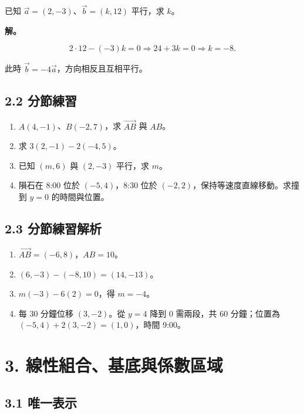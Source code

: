 \documentclass[11pt,a4paper]{article}
\providecommand{\tightlist}{%
  \setlength{\itemsep}{0pt}\setlength{\parskip}{0pt}}
\begin{document}
已知 \(\vec a=(2,-3)\)、\(\vec b=(k,12)\) 平行，求 \(k\)。

\textbf{解。}

\[
2\cdot12-(-3)k=0\Rightarrow24+3k=0\Rightarrow k=-8.
\]

此時 \(\vec b=-4\vec a\)，方向相反且互相平行。

\subsection{2.2 分節練習}\label{ux5206ux7bc0ux7df4ux7fd2-1}

\begin{enumerate}
\def\labelenumi{\arabic{enumi}.}
\tightlist
\item
  \(A(4,-1)\)、\(B(-2,7)\)，求 \(\overrightarrow{AB}\) 與 \(AB\)。
\item
  求 \(3(2,-1)-2(-4,5)\)。
\item
  已知 \((m,6)\) 與 \((2,-3)\) 平行，求 \(m\)。
\item
  隕石在 8:00 位於 \((-5,4)\)，8:30 位於 \((-2,2)\)，保持等速度直線移動。求撞到 \(y=0\) 的時間與位置。
\end{enumerate}

\subsection{2.3 分節練習解析}\label{ux5206ux7bc0ux7df4ux7fd2ux89e3ux6790-1}

\begin{enumerate}
\def\labelenumi{\arabic{enumi}.}
\tightlist
\item
  \(\overrightarrow{AB}=(-6,8)\)，\(AB=10\)。
\item
  \((6,-3)-(-8,10)=(14,-13)\)。
\item
  \(m(-3)-6(2)=0\)，得 \(m=-4\)。
\item
  每 30 分鐘位移 \((3,-2)\)。從 \(y=4\) 降到 \(0\) 需兩段，共 \(60\) 分鐘；位置為 \((-5,4)+2(3,-2)=(1,0)\)，時間 9:00。
\end{enumerate}

\section{3. 線性組合、基底與係數區域}\label{ux7ddaux6027ux7d44ux5408ux57faux5e95ux8207ux4fc2ux6578ux5340ux57df}

\subsection{3.1 唯一表示}\label{ux552fux4e00ux8868ux793a}
\end{document}
